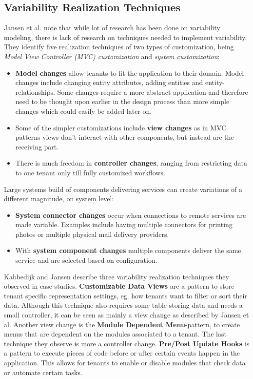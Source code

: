 \subsection{Variability Realization Techniques}
Jansen et al. \cite{jansen2010customization} note that while lot of research has been done on variability modeling, there is lack of research on techniques needed to implement variability. They identify five realization techniques of two types of customization, being \textit{Model View Controller (MVC) customization} and \textit{system customization}:
\begin{itemize}
\item \textbf{Model changes} allow tenants to fit the application to their domain. Model changes include changing entity attributes, adding entities and entity-relationships. Some changes require a more abstract application and therefore need to be thought upon earlier in the design process than more simple changes which could easily be added later on.
\item Some of the simpler customizations include \textbf{view changes} as in MVC patterns views don't interact with other components, but instead are the receiving part.
\item There is much freedom in \textbf{controller changes}, ranging from restricting data to one tenant only till fully customized workflows.
\end{itemize}
Large systems build of components delivering services can create variations of a different magnitude, on system level:
\begin{itemize}
\item \textbf{System connector changes} occur when connections to remote services are made variable. Examples include having multiple connectors for printing photos or multiple physical mail delivery providers.
\item With \textbf{system component changes} multiple components deliver the same service and are selected based on configuration.
\end{itemize}

Kabbedijk and Jansen \cite{kabbedijk2011variability} describe three variability realization techniques they observed in case studies. 
\textbf{Customizable Data Views} are a pattern to store tenant specific representation settings, eg. how tenants want to filter or sort their data. 
Although this technique also requires some table storing data and needs a small controller, it can be seen as mainly a view change as described by Jansen et al. 
Another view change is the \textbf{Module Dependent Menu}-pattern, to create menus that are dependent on the modules associated to a tenant. The last technique they observe is more a controller change. 
\textbf{Pre/Post Update Hooks} is a pattern to execute pieces of code before or after certain events happen in the application. 
This allows for tenants to enable or disable modules that check data or automate certain tasks.

